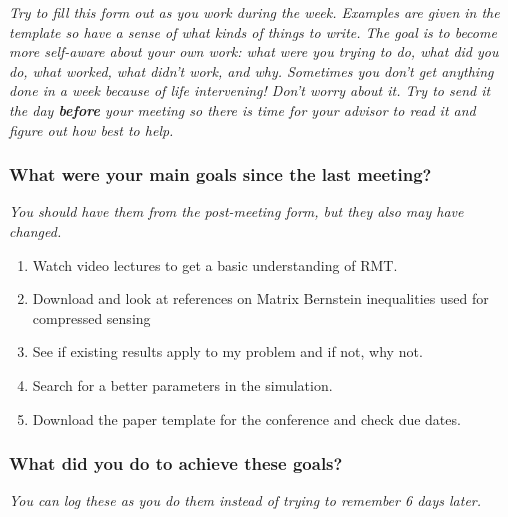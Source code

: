 \documentclass[10pt, letter]{article}
\begin{document}

\noindent \textit{Try to fill this form out as you work during the week. Examples are given in the template so have a sense of what kinds of things to write. The goal is to become more self-aware about your own work: what were you trying to do, what did you do, what worked, what didn't work, and why. Sometimes you don't get anything done in a week because of life intervening! Don't worry about it. Try to send it the day \textbf{before} your meeting so there is time for your advisor to read it and figure out how best to help.}

\subsubsection*{What were your main goals since the last meeting?}

\textit{You should have them from the post-meeting form, but they also may have changed.}


\begin{note}
	\begin{enumerate}
	\item Watch video lectures to get a basic understanding of RMT.
	\item Download and look at references on Matrix Bernstein inequalities used for compressed sensing 
	\item See if existing results apply to my problem and if not, why not.
	\item Search for a better parameters in the simulation.
	\item Download the paper template for the conference and check due dates.
	\end{enumerate}
\end{note}


\subsubsection*{What did you do to achieve these goals?}

\textit{You can log these as you do them instead of trying to remember 6 days later.}
\end{document}
